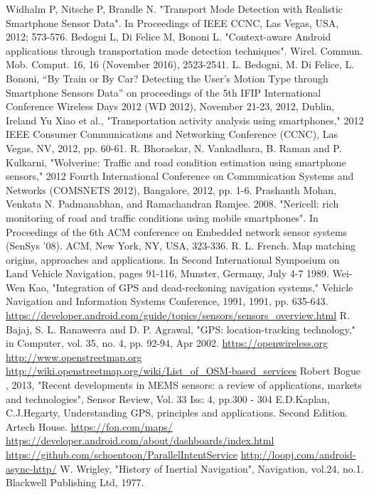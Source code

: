 \documentclass[12pt,a4paper,openright,twoside]{report}
\begin{document}
\begin{thebibliography}{90}             %
\rhead[\fancyplain{}{\bfseries \leftmark}]{\fancyplain{}{\bfseries
\thepage}}
 Widhalm P, Nitsche P, Brandle N. "Transport Mode Detection with Realistic Smartphone Sensor Data". In Proceedings of IEEE CCNC, Las Vegas, USA, 2012; 573-576.
 Bedogni L, Di Felice M, Bononi L. "Context-aware Android applications through transportation mode detection techniques". Wirel. Commun. Mob. Comput. 16, 16 (November 2016), 2523-2541.
 L. Bedogni, M. Di Felice, L. Bononi, “By Train or By Car? Detecting the User’s Motion Type through Smartphone Sensors Data” on proceedings of the 5th IFIP International Conference Wireless Days 2012 (WD 2012), November 21-23, 2012, Dublin, Ireland
 Yu Xiao et al., "Transportation activity analysis using smartphones," 2012 IEEE Consumer Communications and Networking Conference (CCNC), Las Vegas, NV, 2012, pp. 60-61.
 R. Bhoraskar, N. Vankadhara, B. Raman and P. Kulkarni, "Wolverine: Traffic and road condition estimation using smartphone sensors," 2012 Fourth International Conference on Communication Systems and Networks (COMSNETS 2012), Bangalore, 2012, pp. 1-6.
 Prashanth Mohan, Venkata N. Padmanabhan, and Ramachandran Ramjee. 2008. "Nericell: rich monitoring of road and traffic conditions using mobile smartphones". In Proceedings of the 6th ACM conference on Embedded network sensor systems (SenSys '08). ACM, New York, NY, USA, 323-336.
 R. L. French. Map matching origins, approaches and applications. In Second International Symposium on Land Vehicle Navigation, pages 91-116,
Munster, Germany, July 4-7 1989.
 Wei-Wen Kao, "Integration of GPS and dead-reckoning navigation systems," Vehicle Navigation and Information Systems Conference, 1991, 1991, pp. 635-643.
 \url{https://developer.android.com/guide/topics/sensors/sensors_overview.html}
 R. Bajaj, S. L. Ranaweera and D. P. Agrawal, "GPS: location-tracking technology," in Computer, vol. 35, no. 4, pp. 92-94, Apr 2002.
 \url{https://openwireless.org}
 \url{http://www.openstreetmap.org}
 \url{http://wiki.openstreetmap.org/wiki/List_of_OSM-based_services}
 Robert Bogue , 2013, "Recent developments in MEMS sensors: a review of applications, markets and technologies", Sensor Review, Vol. 33 Iss: 4, pp.300 - 304
 E.D.Kaplan, C.J.Hegarty, Understanding GPS, principles and applications. Second Edition. Artech House.
 \url{https://fon.com/maps/}
 \url{https://developer.android.com/about/dashboards/index.html}
 \url{https://github.com/schoentoon/ParallelIntentService}
 \url{http://loopj.com/android-async-http/}
 W. Wrigley, "History of Inertial Navigation", Navigation, vol.24, no.1. Blackwell Publishing Ltd, 1977.

\end{thebibliography}
\end{document}
